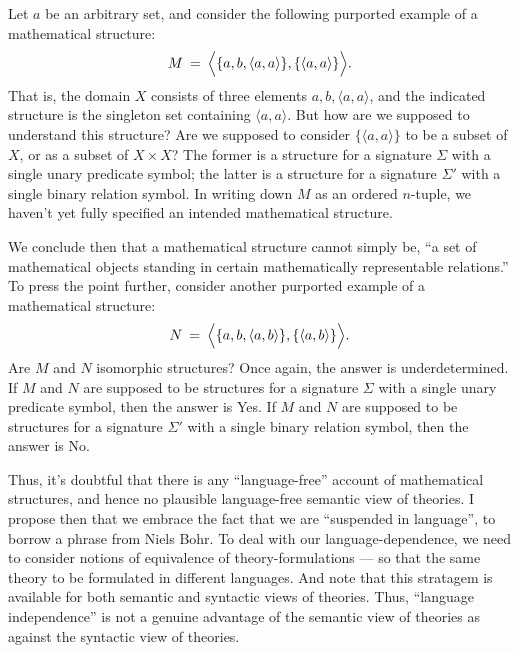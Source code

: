\begin{example} Let $a$ be an arbitrary set, and consider the
  following purported example of a mathematical structure:
  \[ M \: = \: \Bigl\langle \{ a,b,\langle a,a\rangle \} ,\{ \langle
    a,a\rangle \} \Bigr\rangle .\] That is, the domain $X$ consists of
  three elements $a,b,\langle a,a\rangle$, and the indicated structure
  is the singleton set containing $\langle a,a\rangle$.  But how are
  we supposed to understand this structure?  Are we supposed to
  consider $\{ \langle a,a\rangle \}$ to be a subset of $X$, or as a
  subset of $X\times X$?  The former is a structure for a signature
  $\Sigma$ with a single unary predicate symbol; the latter is a
  structure for a signature $\Sigma '$ with a single binary relation
  symbol.  In writing down $M$ as an ordered $n$-tuple, we haven't yet
  fully specified an intended mathematical structure.

  We conclude then that a mathematical structure cannot simply be, ``a
  set of mathematical objects standing in certain mathematically
  representable relations.''  To press the point further, consider
  another purported example of a mathematical structure:
\[ N \: = \: \Bigl\langle \{ a,b,\langle a,b\rangle \} ,\{ \langle a,b\rangle \}
  \Bigr\rangle .\] Are $M$ and $N$ isomorphic structures?  Once again, the
answer is underdetermined.  If $M$ and $N$ are supposed to be
structures for a signature $\Sigma$ with a single unary predicate
symbol, then the answer is Yes.  If $M$ and $N$ are supposed to be
structures for a signature $\Sigma '$ with a single binary relation
symbol, then the answer is No.  \end{example}

Thus, it's doubtful that there is any ``language-free'' account of
mathematical structures, and hence no plausible language-free semantic
view of theories.  I propose then that we embrace the fact that we are
``suspended in language'', to borrow a phrase from Niels Bohr.  To
deal with our language-dependence, we need to consider notions of
equivalence of theory-formulations --- so that the same theory to be
formulated in different languages.  And note that this stratagem is
available for both semantic and syntactic views of theories.  Thus,
``language independence'' is not a genuine advantage of the semantic
view of theories as against the syntactic view of theories.

